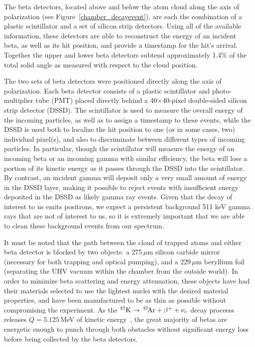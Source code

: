 The beta detectors, located above and below the atom cloud along the axis of polarization (see Figure~\ref{chamber_decayevent}), are each the combination of a plastic scintillator and a set of silicon strip detectors.  Using all of the available information, these detectors are able to reconstruct the energy of an incident beta, as well as its hit position, and provide a timestamp for the hit's arrival.  Together the upper and lower beta detectors subtend approximately 1.4\% of the total solid angle as measured with respect to the cloud position. 

	The two sets of beta detectors were positioned directly along the axis of polarization.  Each beta detector consists of a plastic scintillator and photo-multiplier tube (PMT)  placed directly behind a 40$\times$40-pixel double-sided silicon strip detector (DSSD).    The scintillator is used to measure the overall energy of the incoming particles, as well as to assign a timestamp to these events, while the DSSD is used both to localize the hit position to one (or in some cases, two) individual pixel(s), and also to discriminate between different types of incoming particles.  In particular, though the scintillator will measure the energy of an incoming beta or an incoming gamma with similar efficiency, the beta will lose a portion of its kinetic energy as it passes through the DSSD into the scintillator.  By contrast, an incident gamma will deposit only a very small amount of energy in the DSSD layer, making it possible to reject events with insufficient energy deposited in the DSSD as likely gamma ray events.  Given that the decay of interest to us emits positrons, we expect a persistent background 511 keV gamma rays that are not of interest to us, so it is extremely important that we are able to clean these background events from our spectrum. 


It must be noted that the path between the cloud of trapped atoms and either beta detector is blocked by two objects:  a 275$\,\mu$m silicon carbide mirror (necessary for both trapping and optical pumping), and a 229$\,\mu$m beryllium foil (separating the UHV vacuum within the chamber from the outside world).  In order to minimize beta scattering and energy attenuation, these objects have had their materials selected to use the lightest nuclei with the desired material properties, and have been manufactured to be as thin as possible without compromising the experiment.  As the $^{37}\textrm{K} \rightarrow \,^{37}\textrm{\!Ar} + \beta^{+} + \nu_e$ decay proceess releases $Q=5.125$\,MeV of kinetic energy~\cite{Q_value}, the great majority of betas are energetic enough to punch through both obstacles without significant energy loss before being collected by the beta detectors.  

